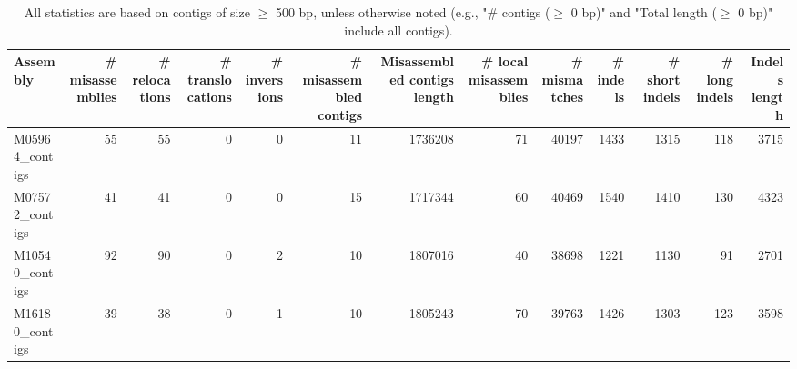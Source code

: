 \documentclass[12pt,a4paper]{article}
\begin{document}
\begin{table}[ht]
\begin{center}
\caption{All statistics are based on contigs of size $\geq$ 500 bp, unless otherwise noted (e.g., "\# contigs ($\geq$ 0 bp)" and "Total length ($\geq$ 0 bp)" include all contigs).}
\begin{tabular}{|l*{12}{|r}|}
\hline
Assembly & \# misassemblies &     \# relocations &     \# translocations &     \# inversions & \# misassembled contigs & Misassembled contigs length & \# local misassemblies & \# mismatches & \# indels &     \# short indels &     \# long indels & Indels length \\ \hline
M05964\_contigs & 55 & 55 & 0 & 0 & 11 & 1736208 & 71 & 40197 & 1433 & 1315 & 118 & 3715 \\ \hline
M07572\_contigs & 41 & 41 & 0 & 0 & 15 & 1717344 & 60 & 40469 & 1540 & 1410 & 130 & 4323 \\ \hline
M10540\_contigs & 92 & 90 & 0 & 2 & 10 & 1807016 & 40 & 38698 & 1221 & 1130 & 91 & 2701 \\ \hline
M16180\_contigs & 39 & 38 & 0 & 1 & 10 & 1805243 & 70 & 39763 & 1426 & 1303 & 123 & 3598 \\ \hline
\end{tabular}
\end{center}
\end{table}
\end{document}
